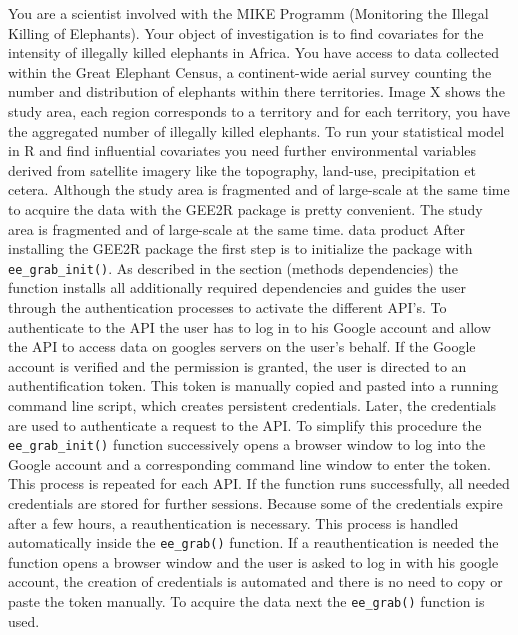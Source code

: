 \documentclass[12pt,twoside,a4paper,final]{report}
\begin{document}
You are a scientist involved with the MIKE Programm (Monitoring the Illegal Killing of Elephants). Your object of investigation is to find covariates for the intensity of illegally killed elephants in Africa. You have access to data collected within the Great Elephant Census, a continent-wide aerial survey counting the number and distribution of elephants within there territories. 
Image X shows the study area, each region corresponds to a territory and for each territory, you have the aggregated number of illegally killed elephants. To run your statistical model in R and find influential covariates you need further environmental variables derived from satellite imagery like the topography, land-use, precipitation et cetera. 
Although the study area is fragmented and of large-scale at the same time to acquire the data with the GEE2R package is pretty convenient.
The study area is fragmented and of large-scale at the same time. 
data product
After installing the GEE2R package the first step is to initialize the package with \texttt{ee\_grab\_init()}. As described in the section (methods dependencies) the function installs all additionally required dependencies and guides the user through the authentication processes to activate the different API's. To authenticate to the API the user has to log in to his Google account and allow the API to access data on googles servers on the user's behalf. If the Google account is verified and the permission is granted, the user is directed to an authentification token. This token is manually copied and pasted into a running command line script, which creates persistent credentials. 
Later, the credentials are used to authenticate a request to the API. To simplify this procedure the \texttt{ee\_grab\_init()} function successively opens a browser window to log into the Google account and a corresponding command line window to enter the token. This process is repeated for each API. If the function runs successfully, all needed credentials are stored for further sessions. Because some of the credentials expire after a few hours, a reauthentication is necessary. This process is handled automatically inside the \texttt{ee\_grab()} function. If a reauthentication is needed the function opens a browser window and the user is asked to log in with his google account, the creation of credentials is automated and there is no need to copy or paste the token manually.
To acquire the data next the \texttt{ee\_grab()} function is used.
\end{document}
